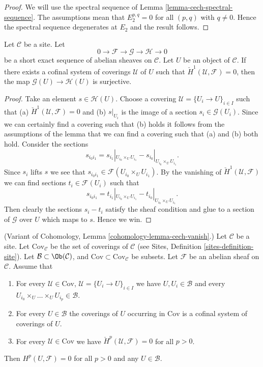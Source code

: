 \begin{proof}
We will use the spectral sequence of
Lemma \ref{lemma-cech-spectral-sequence}.
The assumptions mean that $E_2^{p, q} = 0$ for all $(p, q)$ with
$q \not = 0$. Hence the spectral sequence degenerates at $E_2$
and the result follows.
\end{proof}

\begin{lemma}
\label{lemma-ses-cech-h1}
Let $\mathcal{C}$ be a site.
Let
$$
0 \to \mathcal{F} \to \mathcal{G} \to \mathcal{H} \to 0
$$
be a short exact sequence of abelian sheaves on $\mathcal{C}$.
Let $U$ be an object of $\mathcal{C}$. If there exists a cofinal system
of coverings $\mathcal{U}$ of $U$ such that
$\check{H}^1(\mathcal{U}, \mathcal{F}) = 0$,
then the map $\mathcal{G}(U) \to \mathcal{H}(U)$ is
surjective.
\end{lemma}

\begin{proof}
Take an element $s \in \mathcal{H}(U)$. Choose a covering
$\mathcal{U} = \{U_i \to U\}_{i \in I}$ such that
(a) $\check{H}^1(\mathcal{U}, \mathcal{F}) = 0$ and (b)
$s|_{U_i}$ is the image of a section $s_i \in \mathcal{G}(U_i)$.
Since we can certainly find a covering such that (b) holds
it follows from the assumptions of the lemma that we can find
a covering such that (a) and (b) both hold.
Consider the sections
$$
s_{i_0i_1} =
s_{i_1}|_{U_{i_0} \times_U U_{i_1}} - s_{i_0}|_{U_{i_0} \times_U U_{i_1}}.
$$
Since $s_i$ lifts $s$ we see that
$s_{i_0i_1} \in \mathcal{F}(U_{i_0} \times_U U_{i_1})$.
By the vanishing of $\check{H}^1(\mathcal{U}, \mathcal{F})$ we can
find sections $t_i \in \mathcal{F}(U_i)$ such that
$$
s_{i_0i_1} =
t_{i_1}|_{U_{i_0} \times_U U_{i_1}} - t_{i_0}|_{U_{i_0} \times_U U_{i_1}}.
$$
Then clearly the sections $s_i - t_i$ satisfy the sheaf condition
and glue to a section of $\mathcal{G}$ over $U$ which maps to $s$.
Hence we win.
\end{proof}

\begin{lemma}
\label{lemma-cech-vanish-collection}
(Variant of Cohomology, Lemma \ref{cohomology-lemma-cech-vanish}.)
Let $\mathcal{C}$ be a site. Let $\text{Cov}_\mathcal{C}$ be the set
of coverings of $\mathcal{C}$ (see
Sites, Definition \ref{sites-definition-site}). Let
$\mathcal{B} \subset \Ob(\mathcal{C})$, and
$\text{Cov} \subset \text{Cov}_\mathcal{C}$
be subsets. Let $\mathcal{F}$ be an abelian sheaf on $\mathcal{C}$.
Assume that
\begin{enumerate}
\item For every $\mathcal{U} \in \text{Cov}$,
$\mathcal{U} = \{U_i \to U\}_{i \in I}$ we have
$U, U_i \in \mathcal{B}$ and every
$U_{i_0} \times_U \ldots \times_U U_{i_p} \in \mathcal{B}$.
\item For every $U \in \mathcal{B}$ the coverings of $U$
occurring in $\text{Cov}$ is a cofinal system of coverings of $U$.
\item For every $\mathcal{U} \in \text{Cov}$ we have
$\check{H}^p(\mathcal{U}, \mathcal{F}) = 0$ for all $p > 0$.
\end{enumerate}
Then $H^p(U, \mathcal{F}) = 0$ for all $p > 0$ and any $U \in \mathcal{B}$.
\end{lemma}

